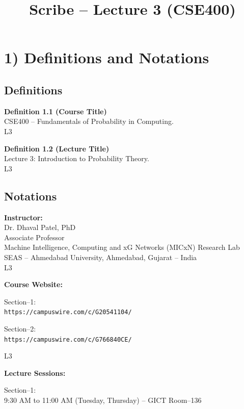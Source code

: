 \documentclass[12pt]{article}
\title{Scribe -- Lecture 3 (CSE400)}
\author{}
\date{}
\begin{document}
\maketitle

\section*{1) Definitions and Notations}

\subsection*{Definitions}

\textbf{Definition 1.1 (Course Title)}\\
CSE400 -- Fundamentals of Probability in Computing. \\
L3

\vspace{0.3cm}

\textbf{Definition 1.2 (Lecture Title)}\\
Lecture 3: Introduction to Probability Theory. \\
L3

\subsection*{Notations}

\textbf{Instructor:}\\
Dr. Dhaval Patel, PhD\\
Associate Professor\\
Machine Intelligence, Computing and xG Networks (MICxN) Research Lab\\
SEAS -- Ahmedabad University, Ahmedabad, Gujarat -- India \\
L3

\vspace{0.3cm}

\textbf{Course Website:}

Section--1: \\
\texttt{https://campuswire.com/c/G20541104/}

Section--2: \\
\texttt{https://campuswire.com/c/G766840CE/}

L3

\vspace{0.3cm}

\textbf{Lecture Sessions:}

Section--1:\\
9:30 AM to 11:00 AM (Tuesday, Thursday) -- GICT Room--136
\end{document}
